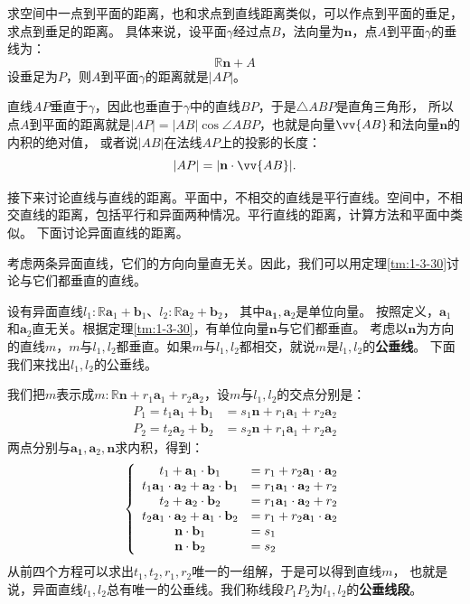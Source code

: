 \documentclass[12pt,UTF8]{ctexbook}
\begin{document}
求空间中一点到平面的距离，也和求点到直线距离类似，可以作点到平面的垂足，求点到垂足的距离。
具体来说，设平面$\gamma$经过点$B$，法向量为$\mathbf{n}$，点$A$到平面$\gamma$的垂线为：
$$ \mathbb{R}\mathbf{n} + A$$
设垂足为$P$，则$A$到平面$\gamma$的距离就是$|AP|$。

直线$AP$垂直于$\gamma$，因此也垂直于$\gamma$中的直线$BP$，于是$\triangle ABP$是直角三角形，
所以点$A$到平面的距离就是$|AP| = |AB|\cos{\angle ABP}$，也就是向量$\vv{AB}$和法向量$\mathbf{n}$的内积的绝对值，
或者说$|AB|$在法线$AP$上的投影的长度：
$$ |AP| = |\mathbf{n}\cdot \vv{AB}|. $$

接下来讨论直线与直线的距离。平面中，不相交的直线是平行直线。空间中，不相交直线的距离，包括平行和异面两种情况。平行直线的距离，计算方法和平面中类似。
下面讨论异面直线的距离。

考虑两条异面直线，它们的方向向量直无关。因此，我们可以用定理\ref{tm:1-3-30}讨论与它们都垂直的直线。

设有异面直线$l_1:\mathbb{R}\mathbf{a}_1 + \mathbf{b}_1$、$l_2:\mathbb{R}\mathbf{a}_2 + \mathbf{b}_2$，
其中$\mathbf{a_1}, \mathbf{a}_2$是单位向量。
按照定义，$\mathbf{a}_1$和$\mathbf{a}_2$直无关。根据定理\ref{tm:1-3-30}，有单位向量$\mathbf{n}$与它们都垂直。
考虑以$\mathbf{n}$为方向的直线$m$，$m$与$l_1,l_2$都垂直。如果$m$与$l_1,l_2$都相交，就说$m$是$l_1,l_2$的\textbf{公垂线}。
下面我们来找出$l_1,l_2$的公垂线。

我们把$m$表示成$m: \mathbb{R}\mathbf{n} + r_1\mathbf{a}_1 + r_2\mathbf{a}_2$，设$m$与$l_1,l_2$的交点分别是：
\begin{align*}
    P_1 = t_1\mathbf{a}_1 + \mathbf{b}_1 &= s_1\mathbf{n} + r_1\mathbf{a}_1 + r_2\mathbf{a}_2  \\
    P_2 = t_2\mathbf{a}_2 + \mathbf{b}_2 &= s_2\mathbf{n} + r_1\mathbf{a}_1 + r_2\mathbf{a}_2  
\end{align*}
两点分别与$\mathbf{a_1}, \mathbf{a}_2,\mathbf{n}$求内积，得到：
$$
\left\{
\begin{array}[]{cl}
    t_1 + \mathbf{a}_1\cdot\mathbf{b}_1 &= r_1 + r_2\mathbf{a}_1\cdot\mathbf{a}_2 \\
    t_1\mathbf{a}_1\cdot\mathbf{a}_2 + \mathbf{a}_2\cdot\mathbf{b}_1 &= r_1\mathbf{a}_1\cdot\mathbf{a}_2 + r_2 \\
    t_2 + \mathbf{a}_2\cdot\mathbf{b}_2 &= r_1\mathbf{a}_1\cdot\mathbf{a}_2 + r_2 \\
    t_2\mathbf{a}_1\cdot\mathbf{a}_2 + \mathbf{a}_1\cdot\mathbf{b}_2 &= r_1 + r_2\mathbf{a}_1\cdot\mathbf{a}_2 \\
    \mathbf{n}\cdot\mathbf{b}_1 &= s_1 \\
    \mathbf{n}\cdot\mathbf{b}_2 &= s_2
\end{array}
\right.
$$
从前四个方程可以求出$t_1,t_2,r_1,r_2$唯一的一组解，于是可以得到直线$m$，
也就是说，异面直线$l_1,l_2$总有唯一的公垂线。我们称线段$P_1P_2$为$l_1,l_2$的\textbf{公垂线段}。
\end{document}
